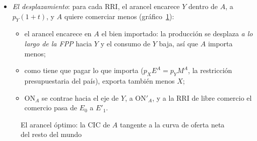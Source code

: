 \documentclass[11pt]{article}
\begin{document}
\begin{itemize}
\item \emph{El desplazamiento}: para cada RRI, el arancel encarece $Y$ dentro de $A$, a $p_Y(1+t)$, y $A$ quiere comerciar menos (gráfico~\ref{fig:arancel-optimo}):
  \begin{itemize}
  \item el arancel encarece en $A$ el bien importado: la producción se desplaza \emph{a lo largo de la FPP} hacia $Y$ y el consumo de $Y$ baja, así que $A$ importa menos;
  \item como tiene que pagar lo que importa ($p_XE^A=p_YM^A$, la restricción presupuestaria del país), exporta también menos $X$;
  \item ON$_A$ se contrae hacia el eje de $Y$, a ON$'_A$, y a la RRI de libre comercio el comercio pasa de $E_0$ a $E'_1$.
  \end{itemize}
\end{itemize}
\begin{figure}[H]
\centering
\caption{El arancel óptimo: la CIC de $A$ tangente a la curva de oferta neta del resto del mundo}\label{fig:arancel-optimo}
\end{figure}
\end{document}
